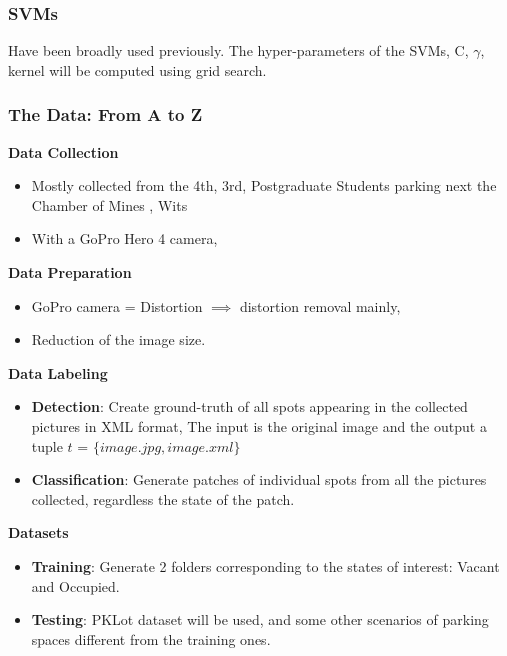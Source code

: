 \documentclass{beamer}
\begin{document}
\begin{frame}
\frametitle{SVMs}
Have been broadly used previously. The hyper-parameters of the SVMs, C, $\gamma$, kernel will be computed using grid search. 
\end{frame}


\begin{frame}[allowframebreaks]
\frametitle{The Data: From A to Z} 
\textbf{Data Collection}
\begin{itemize}
	\item Mostly collected from the 4th, 3rd, Postgraduate Students parking next the Chamber of Mines , Wits
	\item With a GoPro Hero 4 camera,
\end{itemize}
\textbf{Data Preparation}
\begin{itemize}
	\item GoPro camera = Distortion $\implies$ distortion removal mainly,
	\item Reduction of the image size.
\end{itemize}
\textbf{Data Labeling}
\begin{itemize}
	\item \textbf{Detection}: Create ground-truth of all spots appearing in the collected pictures  in XML format,
	The input is the original image and the output a tuple $t$ = $\lbrace image.jpg,image.xml\rbrace$
	\item \textbf{Classification}: Generate patches of individual spots from all the pictures collected, regardless the state of the patch.
\end{itemize}
\framebreak
\textbf{Datasets}
\begin{itemize}
	\item \textbf{Training}: Generate 2 folders corresponding to the states of interest: Vacant and Occupied.
	\item \textbf{Testing}: PKLot dataset will be used, and some other scenarios of parking spaces different from the training ones.
\end{itemize}

\end{frame}
\end{document}

